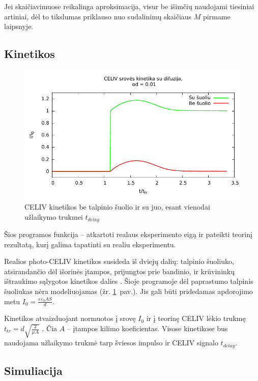 Jei skaičiavimuose reikalinga aproksimacija, visur be išimčių naudojami tiesiniai artiniai, dėl to tikslumas priklauso nuo sudalinimų skaičiaus \(M\) pirmame laipsnyje.

\subsection{Kinetikos}

\begin{figure}
\centering
\includegraphics[width=\textwidth]{./media/pdf/jump.pdf} 
\caption{CELIV kinetikos be talpinio šuolio ir su juo, esant vienodai užlaikymo trukmei $t_{delay}$}
\label{fig:suoliai}
\end{figure}


Šios programos funkcija -- atkartoti realaus eksperimento eigą ir pateikti teorinį rezultatą, kurį galima tapatinti su realiu eksperimentu.

Realios photo-CELIV kinetikos susideda iš dviejų dalių: talpinio šuoliuko, atsirandančio dėl išorinės įtampos, prijungtos prie bandinio, ir krūvininkų ištraukimo sąlygotos kinetikos dalies \cite{juška:4946}. Šioje programoje dėl paprastumo talpinis šuoliukas nėra modeliuojamas (žr. \ref{fig:suoliai}~pav.). Jis gali būti pridedamas apdorojimo metu \(I_0 = \frac{\varepsilon \varepsilon_0 A S}{d}\).

Kinetikos atvaizduojant normuotos į srovę \(I_0\) ir į teorinę CELIV lėkio trukmę \(t_{tr} = d \sqrt{\frac{2}{\mu A}} \) \cite{juška:155202}. Čia \(A\) -- įtampos kilimo koeficientas. Visose kinetikose bus naudojama užlaikymo trukmė tarp šviesos impulso ir CELIV signalo $t_{delay}$.

\subsection{Simuliacija}

